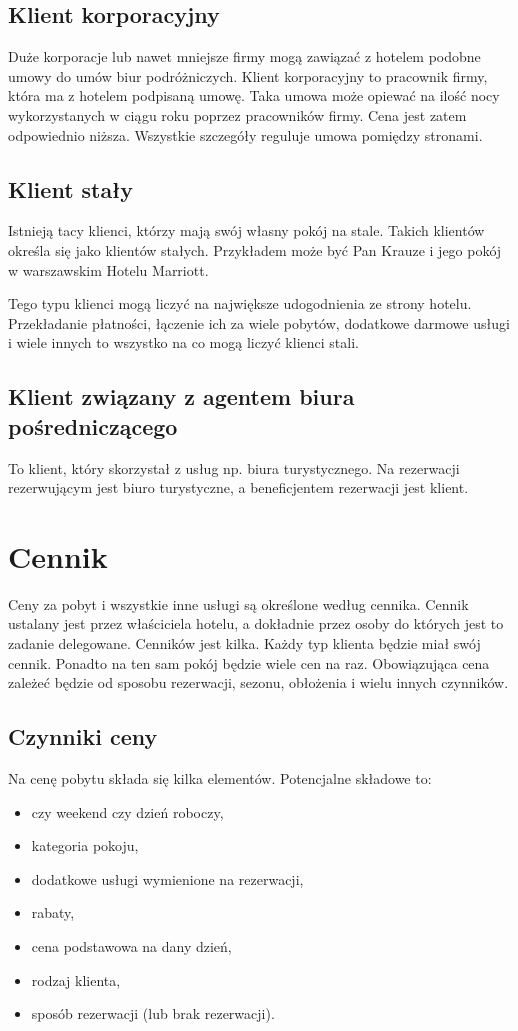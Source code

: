 \documentclass[a4paper,onecolumn,oneside,11pt,wide,floatssmall]{mwrep}
\theoremstyle{definition}
\theoremstyle{plain}%
\theoremstyle{remark}
\begin{document}
\subsection{Klient korporacyjny}
Duże korporacje lub nawet mniejsze firmy mogą zawiązać z hotelem podobne 
umowy do umów biur podróżniczych. Klient korporacyjny to pracownik firmy, 
która ma z hotelem podpisaną umowę. Taka umowa może opiewać na ilość nocy 
wykorzystanych w ciągu roku poprzez pracowników firmy. Cena jest zatem 
odpowiednio niższa. Wszystkie szczegóły reguluje umowa pomiędzy stronami.

\subsection{Klient stały}
Istnieją tacy klienci, którzy mają swój własny pokój na stale. Takich 
klientów określa się jako klientów stałych. Przykładem może być Pan Krauze i 
jego pokój w warszawskim Hotelu Marriott.

Tego typu klienci mogą liczyć na największe udogodnienia ze strony hotelu. 
Przekładanie płatności, łączenie ich za wiele pobytów, dodatkowe darmowe 
usługi i wiele innych to wszystko na co mogą liczyć klienci stali.

\subsection{Klient związany z agentem biura pośredniczącego}
To klient, który skorzystał z usług np. biura turystycznego. Na rezerwacji 
rezerwującym jest biuro turystyczne, a beneficjentem rezerwacji jest klient.

\section{Cennik}
Ceny za pobyt i wszystkie inne usługi są określone według cennika. Cennik 
ustalany jest przez właściciela hotelu, a dokładnie przez osoby do których 
jest to zadanie delegowane. Cenników jest kilka. Każdy typ klienta będzie 
miał swój cennik. Ponadto na ten sam pokój będzie wiele cen na raz. 
Obowiązująca cena zależeć będzie od sposobu rezerwacji, sezonu, obłożenia i 
wielu innych czynników.

\subsection{Czynniki ceny}
Na cenę pobytu składa się kilka elementów. Potencjalne składowe to:
\begin{itemize}
  \item czy weekend czy dzień roboczy,
  \item kategoria pokoju,
  \item dodatkowe usługi wymienione na rezerwacji,
  \item rabaty,
  \item cena podstawowa na dany dzień,
  \item rodzaj klienta,
  \item sposób rezerwacji (lub brak rezerwacji).
\end{itemize}
\end{document}
